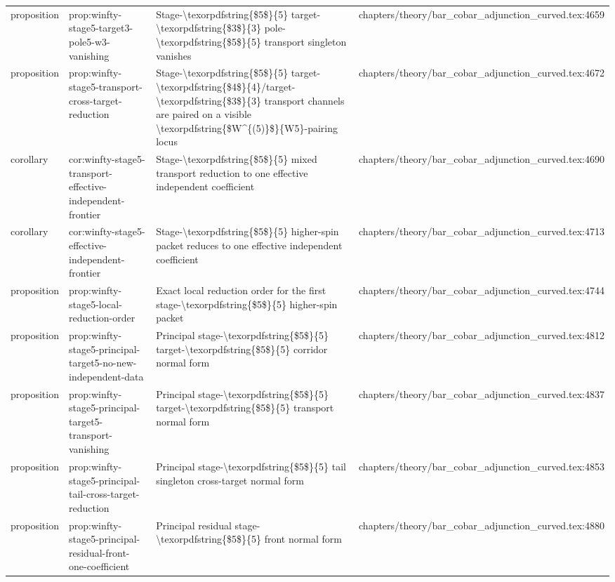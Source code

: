 \documentclass[11pt]{article}
\begin{document}
\begin{longtable}{L{0.10\textwidth}L{0.26\textwidth}L{0.42\textwidth}L{0.22\textwidth}}
proposition & prop:winfty-stage5-target3-pole5-w3-vanishing & Stage-\textbackslash{}texorpdfstring\{\$5\$\}\{5\} target-\textbackslash{}texorpdfstring\{\$3\$\}\{3\} pole-\textbackslash{}texorpdfstring\{\$5\$\}\{5\} transport singleton vanishes & chapters/theory/bar\_cobar\_adjunction\_curved.tex:4659\\
proposition & prop:winfty-stage5-transport-cross-target-reduction & Stage-\textbackslash{}texorpdfstring\{\$5\$\}\{5\} target-\textbackslash{}texorpdfstring\{\$4\$\}\{4\}/target-\textbackslash{}texorpdfstring\{\$3\$\}\{3\} transport channels are paired on a visible \textbackslash{}texorpdfstring\{\$W\textasciicircum{}\{(5)\}\$\}\{W5\}-pairing locus & chapters/theory/bar\_cobar\_adjunction\_curved.tex:4672\\
corollary & cor:winfty-stage5-transport-effective-independent-frontier & Stage-\textbackslash{}texorpdfstring\{\$5\$\}\{5\} mixed transport reduction to one effective independent coefficient & chapters/theory/bar\_cobar\_adjunction\_curved.tex:4690\\
corollary & cor:winfty-stage5-effective-independent-frontier & Stage-\textbackslash{}texorpdfstring\{\$5\$\}\{5\} higher-spin packet reduces to one effective independent coefficient & chapters/theory/bar\_cobar\_adjunction\_curved.tex:4713\\
proposition & prop:winfty-stage5-local-reduction-order & Exact local reduction order for the first stage-\textbackslash{}texorpdfstring\{\$5\$\}\{5\} higher-spin packet & chapters/theory/bar\_cobar\_adjunction\_curved.tex:4744\\
proposition & prop:winfty-stage5-principal-target5-no-new-independent-data & Principal stage-\textbackslash{}texorpdfstring\{\$5\$\}\{5\} target-\textbackslash{}texorpdfstring\{\$5\$\}\{5\} corridor normal form & chapters/theory/bar\_cobar\_adjunction\_curved.tex:4812\\
proposition & prop:winfty-stage5-principal-target5-transport-vanishing & Principal stage-\textbackslash{}texorpdfstring\{\$5\$\}\{5\} target-\textbackslash{}texorpdfstring\{\$5\$\}\{5\} transport normal form & chapters/theory/bar\_cobar\_adjunction\_curved.tex:4837\\
proposition & prop:winfty-stage5-principal-tail-cross-target-reduction & Principal stage-\textbackslash{}texorpdfstring\{\$5\$\}\{5\} tail singleton cross-target normal form & chapters/theory/bar\_cobar\_adjunction\_curved.tex:4853\\
proposition & prop:winfty-stage5-principal-residual-front-one-coefficient & Principal residual stage-\textbackslash{}texorpdfstring\{\$5\$\}\{5\} front normal form & chapters/theory/bar\_cobar\_adjunction\_curved.tex:4880\\

\end{longtable}
\end{document}
